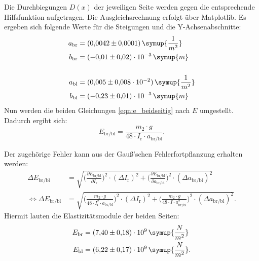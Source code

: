 Die Durchbiegungen $D(x)$ der jeweiligen Seite werden gegen die entsprechende Hilfsfunktion aufgetragen. Die Ausgleichsrechnung erfolgt über Matplotlib.
Es ergeben sich folgende Werte für die Steigungen und die Y-Achsenabschnitte:
\begin{equation*}
\begin{aligned}
a_{\text{br}} &= (0{,}0042 \pm 0{,}0001)\, \symup{\frac{1}{m^2}} \\
b_{\text{br}} &= (-0{,}01 \pm 0{,}02)\cdot 10^{-3} \, \symup{m} \\
\\
a_{\text{bl}} &= (0{,}005 \pm 0{,}008\cdot10^{-2})\, \symup{\frac{1}{m^2}} \\
b_{\text{bl}} &= (-0{,}23 \pm 0{,}01)\cdot 10^{-3} \, \symup{m}
\end{aligned}
\end{equation*}
Nun werden die beiden Gleichungen \eqref{eqn:e_beidseitig} nach $E$ umgestellt. Dadurch ergibt sich:
\begin{equation*}
E_{\text{br/bl}} = \frac{m_2\cdot g}{48\cdot I_{\text{r}} \cdot a_{\text{br/bl}}}.
\end{equation*}

Der zugehörige Fehler kann aus der Gauß'schen Fehlerfortpflanzung erhalten werden:
\begin{equation*}
 \begin{aligned}
 \Delta E_{\text{br/bl}} &= \sqrt{\biggl(\frac{\partial E_{\text{br/bl}}}{\partial I_{\text{r}}}\biggr)^2\cdot (\Delta I_{\text{r}})^2 + \biggl(\frac{\partial E_{\text{br/bl}}}{\partial a_{\text{br/bl}}}\biggr)^2\cdot (\Delta a_{\text{br/bl}})^2} \\
 \iff \Delta E_{\text{br/bl}} &= \sqrt{\biggl(\frac{m_2\cdot g}{48\cdot I_{\text{r}}^2 \cdot a_{\text{br/bl}}}\biggr)^2 \cdot (\Delta I_{\text{r}})^2 + \biggl(\frac{m_2\cdot g}{48\cdot I \cdot a_{\text{br/bl}}^2}\biggr)^2 \cdot (\Delta a_{\text{br/bl}})^2}.
 \end{aligned}
 \end{equation*}
Hiermit lauten die Elastizitätsmodule der beiden Seiten:
\begin{equation*}
\begin{aligned}
E_{\text{br}} &= (7{,}40 \pm 0{,}18)\cdot 10^9 \, \symup{\frac{N}{m^2}} \\
E_{\text{bl}} &= (6{,}22 \pm 0{,}17)\cdot 10^9 \, \symup{\frac{N}{m^2}}.
\end{aligned}
\end{equation*}
